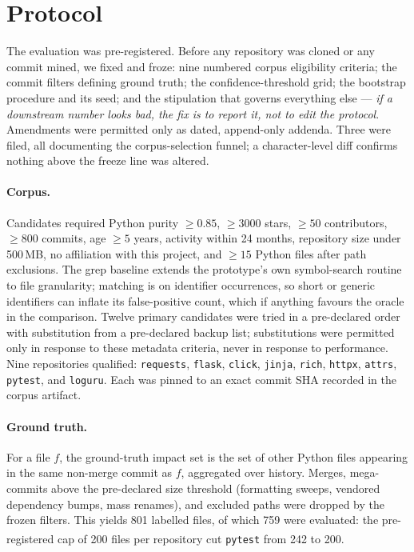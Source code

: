 \documentclass[sigconf,review,anonymous]{acmart}
\newcommand{\corr}{\textsuperscript{\dag}}
\begin{document}
\section{Protocol}\label{sec:protocol}

The evaluation was pre-registered. Before any repository was cloned or any commit mined, we
fixed and froze: nine numbered corpus eligibility criteria; the commit filters defining
ground truth; the confidence-threshold grid; the bootstrap procedure and its seed; and the
stipulation that governs everything else --- \emph{if a downstream number looks bad, the fix
is to report it, not to edit the protocol}. Amendments were permitted only as dated,
append-only addenda. Three were filed, all documenting the corpus-selection funnel; a
character-level diff confirms nothing above the freeze line was altered.

\paragraph{Corpus.} Candidates required Python purity $\geq 0.85$, $\geq 3000$ stars,
$\geq 50$ contributors, $\geq 800$ commits, age $\geq 5$ years, activity within 24 months,
repository size under 500\,MB, no affiliation with this project, and $\geq 15$ Python files
after path exclusions. The grep baseline extends the prototype's own symbol-search routine to file
granularity; matching is on identifier occurrences, so short or generic identifiers can inflate its
false-positive count, which if anything favours the oracle in the comparison. Twelve primary candidates were tried in a pre-declared order with
substitution from a pre-declared backup list; substitutions were permitted only in response
to these metadata criteria, never in response to performance. Nine repositories qualified:
\texttt{requests}, \texttt{flask}, \texttt{click}, \texttt{jinja}, \texttt{rich},
\texttt{httpx}, \texttt{attrs}, \texttt{pytest}, and \texttt{loguru}. Each was pinned to an
exact commit SHA recorded in the corpus artifact.

\paragraph{Ground truth.} For a file $f$, the ground-truth impact set is the set of other
Python files appearing in the same non-merge commit as $f$, aggregated over history. Merges,
mega-commits above the pre-declared size threshold (formatting sweeps, vendored dependency
bumps, mass renames), and excluded paths were dropped by the frozen filters. This yields
801 labelled files, of which 759 were evaluated: the pre-registered cap of 200 files per
repository cut \texttt{pytest} from 242 to 200\corr{}.
\end{document}
